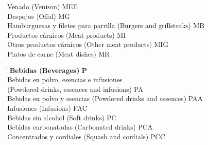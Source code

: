 \begin{small}
\begin{tabbing}
                \hspace{1cm}Venado (Venison) \> MEE \\
            \hspace{0.5cm}Despojos (Offal) \> MG \\
            \hspace{0.5cm}Hamburguesas y filetes para parrilla (Burgers and grillsteaks) \> MB \\
            \hspace{0.5cm}Productos cárnicos (Meat products) \> MI \\
                \hspace{1cm}Otros productos cárnicos (Other meat products) \> MIG \\
            \hspace{0.5cm}Platos de carne (Meat dishes) \> MR \\
    \end{tabbing}

    \vspace{-1.25cm}
    
    \begin{tabbing}
    \hspace{15cm} \= \hspace{0cm} \kill
        \textbf{Bebidas (Beverages)} \> \textbf{P} \\
            \hspace{0.5cm}Bebidas en polvo, esencias e infusiones  \\
            \hspace{0.5cm}(Powdered drinks, essences and infusions) \> PA \\
                \hspace{1cm}Bebidas en polvo y esencias (Powdered drinks and essences) \> PAA \\
                \hspace{1cm}Infusiones (Infusions) \> PAC \\
            \hspace{0.5cm}Bebidas sin alcohol (Soft drinks) \> PC \\
                \hspace{1cm}Bebidas carbonatadas (Carbonated drinks) \> PCA \\
                \hspace{1cm}Concentrados y cordiales (Squash and cordials) \> PCC \\
    \end{tabbing}

    \vspace{-1.25cm}
    

\end{small}
